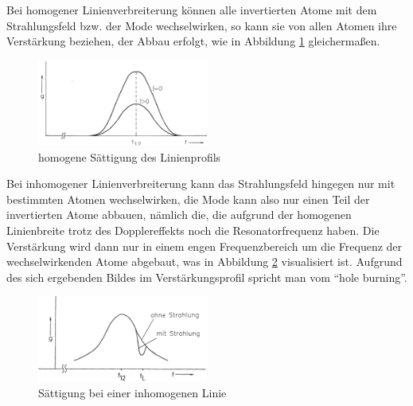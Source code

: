 \documentclass[a4paper,twoside,final]{article}
\begin{document}
Bei homogener Linienverbreiterung können alle invertierten Atome mit dem Strahlungsfeld bzw. der Mode wechselwirken, so kann sie von allen Atomen ihre Verstärkung beziehen, der Abbau erfolgt, wie in Abbildung \ref{fig:homogen} gleichermaßen.

\begin{figure}[htp]
    \centering
        \includegraphics[width=0.5\textwidth]{Bilder/Saettigung_homogen.pdf}
    \caption{homogene Sättigung des Linienprofils}
    \label{fig:homogen}
\end{figure}

Bei inhomogener Linienverbreiterung kann das Strahlungsfeld hingegen nur mit bestimmten Atomen wechselwirken, die Mode kann also nur einen Teil der invertierten Atome abbauen, nämlich die, die aufgrund der homogenen Linienbreite trotz des Dopplereffekts noch die Resonatorfrequenz haben. Die Verstärkung wird dann nur in einem engen Frequenzbereich um die Frequenz der wechselwirkenden Atome abgebaut, was in Abbildung \ref{fig:inhomogen} visualisiert ist. Aufgrund des sich ergebenden Bildes im Verstärkungsprofil spricht man vom ``hole burning''.

\begin{figure}[htp]
    \centering
        \includegraphics[width=0.5\textwidth]{Bilder/Saettigung_inhomogen.pdf}
    \caption{Sättigung bei einer inhomogenen Linie}
    \label{fig:inhomogen}
\end{figure}
\end{document}
